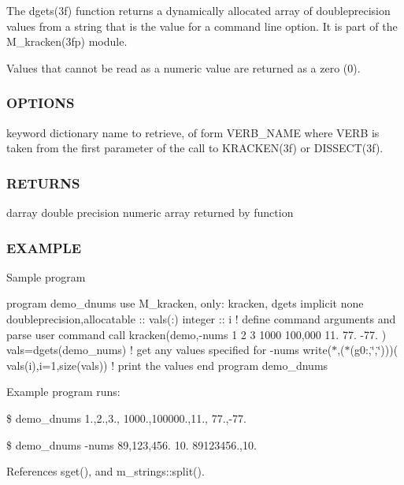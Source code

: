 The dgets(3f) function returns a dynamically allocated array of doubleprecision values from a string that is the value for a command line option. It is part of the M\+\_\+kracken(3fp) module.

Values that cannot be read as a numeric value are returned as a zero (0). \subsubsection*{O\+P\+T\+I\+O\+NS}

keyword dictionary name to retrieve, of form V\+E\+R\+B\+\_\+\+N\+A\+ME where V\+E\+RB is taken from the first parameter of the call to K\+R\+A\+C\+K\+E\+N(3f) or D\+I\+S\+S\+E\+C\+T(3f). \subsubsection*{R\+E\+T\+U\+R\+NS}

darray double precision numeric array returned by function \subsubsection*{E\+X\+A\+M\+P\+LE}

Sample program

program demo\+\_\+dnums use M\+\_\+kracken, only\+: kracken, dgets implicit none doubleprecision,allocatable \+:\+: vals(\+:) integer \+:\+: i ! define command arguments and parse user command call kracken(\textquotesingle{}demo\textquotesingle{},\textquotesingle{}-\/nums 1 2 3 1000 100,000 11. 77. -\/77.\textquotesingle{} ) vals=dgets(\textquotesingle{}demo\+\_\+nums\textquotesingle{}) ! get any values specified for -\/nums write($\ast$,\textquotesingle{}($\ast$(g0\+:,\char`\"{},\char`\"{}))\textquotesingle{})( vals(i),i=1,size(vals)) ! print the values end program demo\+\_\+dnums

Example program runs\+:

\$ demo\+\_\+dnums 1.,2.,3., 1000.,100000.,11., 77.,-\/77.

\$ demo\+\_\+dnums -\/nums 89,123,456. 10. 89123456.,10. 

References sget(), and m\+\_\+strings\+::split().

\mbox{\label{namespacem__kracken_a2cb376f8a8e26e489a45cafcda66ea3e}} 
